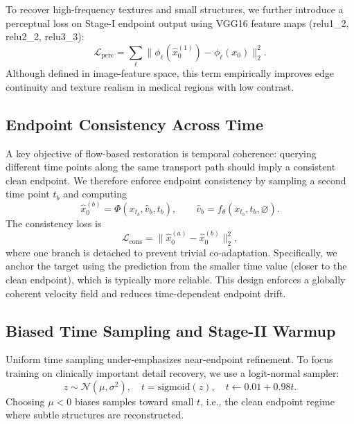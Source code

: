 To recover high-frequency textures and small structures, we further introduce a perceptual loss on Stage-I endpoint output using VGG16 feature maps (relu1\_2, relu2\_2, relu3\_3):
\begin{equation}
 \mathcal{L}_{\mathrm{perc}}=\sum_{\ell}\lVert\phi_{\ell}(\hat x_0^{(1)})-\phi_{\ell}(x_0)\rVert_2^2.
\end{equation}
Although defined in image-feature space, this term empirically improves edge continuity and texture realism in medical regions with low contrast.

\subsection{Endpoint Consistency Across Time}
\label{subsec:consistency}
A key objective of flow-based restoration is temporal coherence: querying different time points along the same transport path should imply a consistent clean endpoint. We therefore enforce endpoint consistency by sampling a second time point $t_b$ and computing
\begin{equation}
 \hat x_0^{(b)}=\Phi(x_{t_b},\hat v_b,t_b),\qquad \hat v_b=f_{\theta}(x_{t_b},t_b,\varnothing).
\end{equation}
The consistency loss is
\begin{equation}
 \mathcal{L}_{\mathrm{cons}}=\lVert\hat x_0^{(a)}-\hat x_0^{(b)}\rVert_2^2,
\end{equation}
where one branch is detached to prevent trivial co-adaptation. Specifically, we anchor the target using the prediction from the smaller time value (closer to the clean endpoint), which is typically more reliable. This design enforces a globally coherent velocity field and reduces time-dependent endpoint drift.

\subsection{Biased Time Sampling and Stage-II Warmup}
\label{subsec:sampling}
Uniform time sampling under-emphasizes near-endpoint refinement. To focus training on clinically important detail recovery, we use a logit-normal sampler:
\begin{equation}
 z\sim\mathcal{N}(\mu,\sigma^2),\quad t=\mathrm{sigmoid}(z),\quad t\leftarrow 0.01+0.98t.
\end{equation}
Choosing $\mu<0$ biases samples toward small $t$, i.e., the clean endpoint regime where subtle structures are reconstructed.

